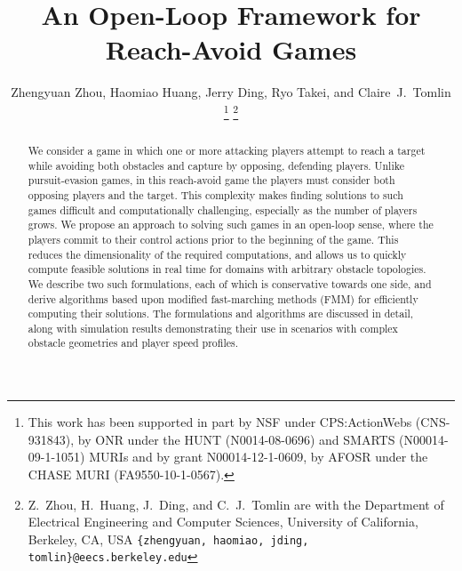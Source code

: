\documentclass[12pt,draftcls,onecolumn]{IEEEtran}
\title{An Open-Loop Framework for Reach-Avoid Games}
\author{Zhengyuan Zhou, Haomiao Huang, Jerry Ding, Ryo Takei, and Claire~J.~Tomlin

\thanks{This work has been supported in part by NSF under CPS:ActionWebs
(CNS-931843), by ONR under the HUNT (N0014-08-0696) and
SMARTS (N00014-09-1-1051) MURIs and by grant N00014-12-1-0609, by AFOSR
under the CHASE MURI (FA9550-10-1-0567).}\vspace{-1cm}%
\thanks{Z.~Zhou, H.~Huang, J.~Ding, and C.~J.~Tomlin are with the Department of Electrical Engineering and Computer Sciences,
        University of California, Berkeley, CA, USA
        {\tt\small \{zhengyuan, haomiao, jding, tomlin\}@eecs.berkeley.edu}}        
}
\begin{document}
\maketitle
\thispagestyle{empty}
\pagestyle{empty}


\begin{abstract}
We consider a game in which one or more attacking players attempt to reach a target while avoiding both obstacles and capture by opposing, defending players. 
Unlike pursuit-evasion games, in this reach-avoid game the players must consider both opposing players and the target.
This complexity makes finding solutions to such games difficult and computationally challenging, especially as the number of players grows.
We propose an approach to solving such games in an open-loop sense, where the players commit to their control actions prior to the beginning of the game.
This reduces the dimensionality of the required computations, and allows us to quickly compute feasible solutions in real time for domains with arbitrary obstacle topologies. 
We describe two such formulations, each of which is conservative towards one side, and derive algorithms based upon modified fast-marching methods (FMM) for efficiently computing their solutions.
The formulations and algorithms are discussed in detail, along with simulation results demonstrating their use in scenarios with complex obstacle geometries and player speed profiles.
\end{abstract}






%






\end{document}

